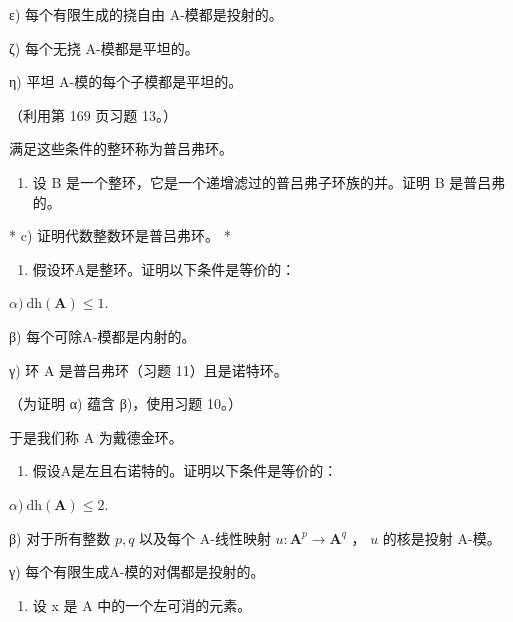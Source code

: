 ε) 每个有限生成的挠自由 A-模都是投射的。

ζ) 每个无挠 A-模都是平坦的。

η) 平坦 A-模的每个子模都是平坦的。

（利用第 169 页习题 13。）

满足这些条件的整环称为普吕弗环。

\begin{enumerate}
\def\labelenumi{\alph{enumi})}
\setcounter{enumi}{1}
\tightlist
\item
  设 B 是一个整环，它是一个递增滤过的普吕弗子环族的并。证明 B 是普吕弗的。
\end{enumerate}

* c) 证明代数整数环是普吕弗环。 *

\begin{enumerate}
\def\labelenumi{\arabic{enumi})}
\setcounter{enumi}{11}
\tightlist
\item
  假设环A是整环。证明以下条件是等价的：
\end{enumerate}

\(\alpha)\ \mathrm{dh}(\mathbf{A}) \leqslant 1.\)

β) 每个可除A-模都是内射的。

γ) 环 A 是普吕弗环（习题 11）且是诺特环。

（为证明 α) 蕴含 β)，使用习题 10。）

于是我们称 A 为戴德金环。

\begin{enumerate}
\def\labelenumi{\arabic{enumi})}
\setcounter{enumi}{12}
\tightlist
\item
  假设A是左且右诺特的。证明以下条件是等价的：
\end{enumerate}

\(\alpha)\ \mathrm{dh}(\mathbf{A}) \leqslant 2.\)

β) 对于所有整数 \(p, q\) 以及每个 A-线性映射 \(u: \mathbf{A}^p \to \mathbf{A}^q\) ， \(u\) 的核是投射 A-模。

γ) 每个有限生成A-模的对偶都是投射的。

\begin{enumerate}
\def\labelenumi{\arabic{enumi})}
\setcounter{enumi}{13}
\tightlist
\item
  设 x 是 A 中的一个左可消的元素。
\end{enumerate}

